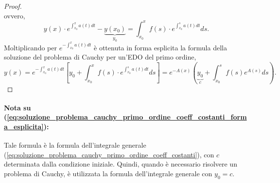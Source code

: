 \begin{proof}
\begin{equation*}
	\end{equation*}
	ovvero,
	\begin{equation*}
		y(x)\cdot e^{\int_{x_0}^xa(t)dt}-\underbrace{y(x_0)}_{y_0}=\int_{x_0}^x f(s)\cdot e^{\int_{x_0}^sa(t)dt}ds.
	\end{equation*}
	Moltiplicando per $e^{-\int_{x_0}^xa(t)dt}$ è ottenuta in forma esplicita la formula della soluzione del problema di Cauchy per un'EDO del primo ordine,
	\begin{equation}\label{eq:soluzione_problema_cauchy_primo_ordine_coeff_costanti_forma_esplicita}
		y(x)= e^{-\int_{x_0}^xa(t) dt}\left[y_0+\int_{x_0}^x f(s)\cdot e^{\int_{x_0}^sa(t)dt}ds\right]=e^{-A(x)}\left(\underbrace{y_0}_c + \int_{x_0}^s f(s) e^{A(s)}ds\right).
	\end{equation}
\end{proof}

\paragraph{Nota su (\ref{eq:soluzione_problema_cauchy_primo_ordine_coeff_costanti_forma_esplicita}):} Tale formula è la formula dell'integrale generale (\ref{eq:soluzione_problema_cauchy_primo_ordine_coeff_costanti}), con $c$ determinata dalla condizione iniziale. Quindi, quando è necessario risolvere un problema di Cauchy, è utilizzata la formula dell'integrale generale con $y_0=c$.

